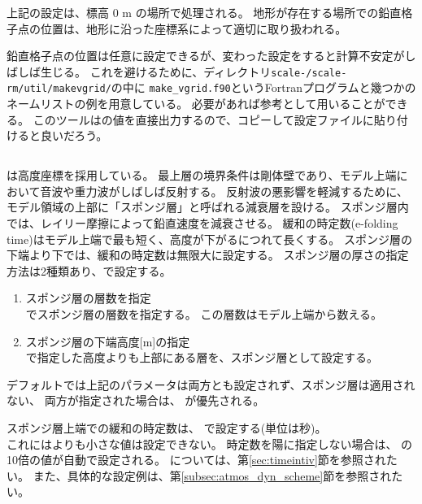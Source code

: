 上記の設定は、標高 0 m の場所で処理される。
地形が存在する場所での鉛直格子点の位置は、地形に沿った座標系によって適切に取り扱われる。


鉛直格子点の位置は任意に設定できるが、変わった設定をすると計算不安定がしばしば生じる。
これを避けるために、ディレクトリ\texttt{scale-\version/scale-rm/util/makevgrid/}の中に
\verb|make_vgrid.f90|というFortranプログラムと幾つかのネームリストの例を用意している。
必要があれば参考として用いることができる。
このツールはの値を直接出力するので、コピーして設定ファイルに貼り付けると良いだろう。

\subsection{\SubsecRayleighDampingSetting} \label{subsec:raydamp}

\scalerm は高度座標を採用している。
最上層の境界条件は剛体壁であり、モデル上端において音波や重力波がしばしば反射する。
反射波の悪影響を軽減するために、モデル領域の上部に「スポンジ層」と呼ばれる減衰層を設ける。
スポンジ層内では、レイリー摩擦によって鉛直速度を減衰させる。
緩和の時定数(e-folding time)はモデル上端で最も短く、高度が下がるにつれて長くする。
スポンジ層の下端より下では、緩和の時定数は無限大に設定する。
スポンジ層の厚さの指定方法は2種類あり、で設定する。
\begin{enumerate}
\item スポンジ層の層数を指定\\
   でスポンジ層の層数を指定する。
  この層数はモデル上端から数える。
\item スポンジ層の下端高度[m]の指定\\
   で指定した高度よりも上部にある層を、スポンジ層として設定する。
\end{enumerate}

デフォルトでは上記のパラメータは両方とも設定されず、スポンジ層は適用されない、
両方が指定された場合は、 が優先される。

スポンジ層上端での緩和の時定数は、 で設定する(単位は秒)。\\
これにはよりも小さな値は設定できない。
時定数を陽に指定しない場合は、 の10倍の値が自動で設定される。
については、第\ref{sec:timeintiv}節を参照されたい。
また、具体的な設定例は、第\ref{subsec:atmos_dyn_scheme}節を参照されたい。

